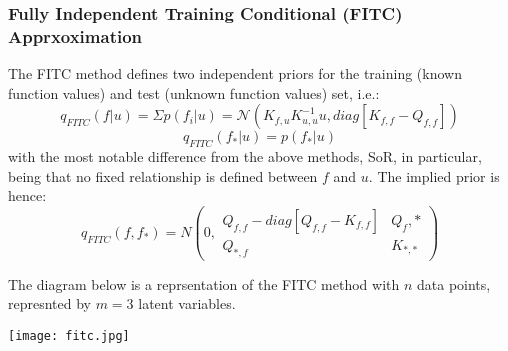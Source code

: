 \documentclass[10pt,sts]{article}
\begin{document}
\begin{multicols}{2}
    \subsubsection{Fully Independent Training Conditional (FITC) Apprxoximation}
    The FITC method defines two independent priors for the training (known function values) and test (unknown function values) set, i.e.:
    $$ q_{FITC}(f | u) = \Sigma p(f_i | u) = \mathcal{N}(K_{f,u}K^{-1}_{u,u}u, diag[K_{f,f} - Q_{f,f}]) $$
    $$ q_{FITC}(f_* | u) = p(f_* | u) $$
    with the most notable difference from the above methods, SoR, in particular, being that no fixed relationship is defined between $f$ and $u$. 
    The implied prior is hence:
    $$ q_{FITC}(f, f_*) = N\left( 0, 
    \begin{matrix}  
        Q_{f, f} - diag[Q_{f,f} - K_{f,f}] & Q_f,* \\
        Q_{*,f} & K_{*,*}
    \end{matrix}
        \right)$$

        The diagram below is a reprsentation of the FITC method with $n$ data points, represnted by $m = 3$ latent variables.

    \texttt{[image: fitc.jpg]}

% 
% 
% 


\end{multicols}
\end{document}
